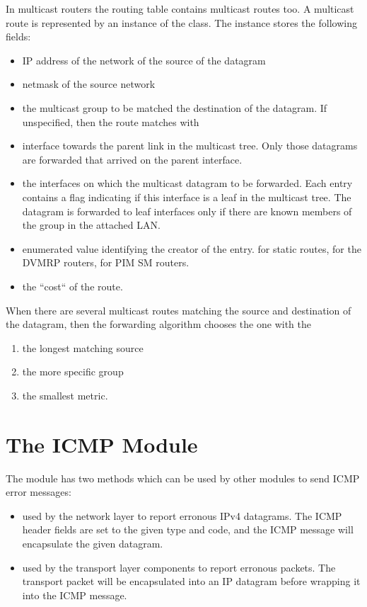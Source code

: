 In multicast routers the routing table contains multicast routes too.
A multicast route is represented by an instance of the 
class. The  instance stores the following fields:
\begin{itemize}
  \item {} IP address of the network of the source of the datagram
  \item {} netmask of the source network
  \item {} the multicast group to be matched the destination of the
  datagram. If unspecified, then the route matches with
  \item {} interface towards the parent link in the multicast tree.
  Only those datagrams are forwarded that arrived on the parent interface.
  \item {} the interfaces on which the multicast datagram to be forwarded.
  Each entry contains a flag indicating if this interface is a leaf in the multicast
  tree. The datagram is forwarded to leaf interfaces only if there are known members
  of the group in the attached LAN.
  \item {} enumerated value identifying the creator of the entry. 
  for static routes,  for the DVMRP routers,  for PIM SM routers.
  \item {} the ``cost`` of the route.
\end{itemize}

When there are several multicast routes matching the source and destination
of the datagram, then the forwarding algorithm chooses the one with the
\begin{enumerate}
  \item the longest matching source
  \item the more specific group
  \item the smallest metric.
\end{enumerate}


\section{The ICMP Module}

The  module has two methods which can be used by other modules
to send ICMP error messages:
\begin{itemize}
  \item {}
        used by the network layer to report erronous IPv4 datagrams. The ICMP header
        fields are set to the given type and code, and the ICMP message will encapsulate
        the given datagram.
  \item {}
        used by the transport layer components to report erronous packets. The transport
        packet will be encapsulated into an IP datagram before wrapping it into the ICMP message.
\end{itemize}

